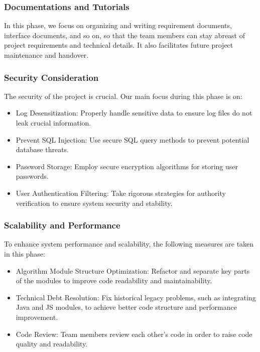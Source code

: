 \subsubsection{Documentations and Tutorials}

In this phase, we focus on organizing and writing requirement documents, interface documents, and so on, so that the team members can stay abreast of project requirements and technical details. It also facilitates future project maintenance and handover.

\subsubsection{Security Consideration}

The security of the project is crucial. Our main focus during this phase is on:

\begin{itemize}
  \item Log Desensitization: Properly handle sensitive data to ensure log files do not leak crucial information.
  \item Prevent SQL Injection: Use secure SQL query methods to prevent potential database threats.
  \item Password Storage: Employ secure encryption algorithms for storing user passwords.
  \item User Authentication Filtering: Take rigorous strategies for authority verification to ensure system security and stability.
\end{itemize}

\subsubsection{Scalability and Performance} 

To enhance system performance and scalability, the following measures are taken in this phase:

\begin{itemize}
    \item Algorithm Module Structure Optimization: Refactor and separate key parts of the modules to improve code readability and maintainability.
    \item Technical Debt Resolution: Fix historical legacy problems, such as integrating Java and JS modules, to achieve better code structure and performance improvement.
    \item Code Review: Team members review each other's code in order to raise code quality and readability.
  \end{itemize}



